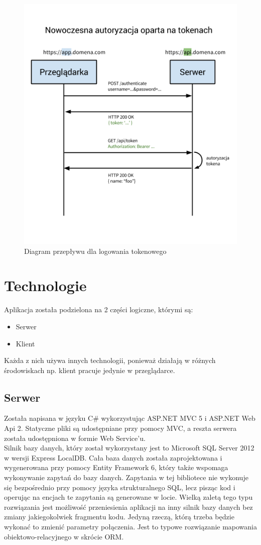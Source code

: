 \documentclass[10pt,titlepage]{article}
\begin{document}
\begin{figure}[htbp]
  \centering
  \includegraphics[scale=0.5]{images/tokenAuth2.png}
  \caption{Diagram przepływu dla logowania tokenowego}
\end{figure}
\section{Technologie}
Aplikacja została podzielona na 2 części logiczne, którymi są:
\begin{itemize}
  \item Serwer
  \item Klient
\end{itemize}
Każda z nich używa innych technologii, ponieważ działają w różnych środowiskach np. klient pracuje jedynie w przeglądarce.
\subsection{Serwer}
Została napisana w języku C\# wykorzystując ASP.NET MVC 5 i ASP.NET Web Api 2. Statyczne pliki są udostępniane przy pomocy MVC, a reszta serwera została udostępniona w formie Web Service'u.\\ Silnik bazy danych, który został wykorzystany jest to Microsoft SQL Server 2012 w wersji Express LocalDB. Cała baza danych została zaprojektowana i wygenerowana przy pomocy Entity Framework 6, który także wspomaga wykonywanie zapytań do bazy danych. Zapytania w tej bibliotece nie wykonuje się bezpośrednio przy pomocy języka strukturalnego SQL, lecz pisząc kod i operując na encjach te zapytania są generowane w locie. Wielką zaletą tego typu rozwiązania jest możliwość przeniesienia aplikacji na inny silnik bazy danych bez zmiany jakiegokolwiek fragmentu kodu. Jedyną rzeczą, którą trzeba będzie wykonać to zmienić parametry połączenia. Jest to typowe rozwiązanie mapowania obiektowo-relacyjnego w skrócie ORM.
\end{document}
